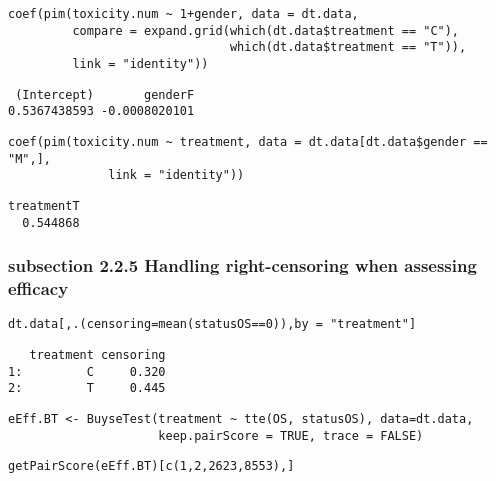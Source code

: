 \documentclass[12pt]{article}
\begin{document}
\lstset{language=r,label= ,caption= ,captionpos=b,numbers=none}
\begin{lstlisting}
coef(pim(toxicity.num ~ 1+gender, data = dt.data,
         compare = expand.grid(which(dt.data$treatment == "C"),
                               which(dt.data$treatment == "T")),
         link = "identity"))

\end{lstlisting}

\begin{verbatim}
 (Intercept)       genderF 
0.5367438593 -0.0008020101
\end{verbatim}


\lstset{language=r,label= ,caption= ,captionpos=b,numbers=none}
\begin{lstlisting}
coef(pim(toxicity.num ~ treatment, data = dt.data[dt.data$gender == "M",],
              link = "identity"))
\end{lstlisting}

\begin{verbatim}
treatmentT 
  0.544868
\end{verbatim}

\subsubsection{subsection 2.2.5 Handling right-censoring when assessing efficacy}
\label{sec:org316ac0f}

\lstset{language=r,label= ,caption= ,captionpos=b,numbers=none}
\begin{lstlisting}
dt.data[,.(censoring=mean(statusOS==0)),by = "treatment"]
\end{lstlisting}

\begin{verbatim}
   treatment censoring
1:         C     0.320
2:         T     0.445
\end{verbatim}


\lstset{language=r,label= ,caption= ,captionpos=b,numbers=none}
\begin{lstlisting}
eEff.BT <- BuyseTest(treatment ~ tte(OS, statusOS), data=dt.data,
                     keep.pairScore = TRUE, trace = FALSE)
\end{lstlisting}

\lstset{language=r,label= ,caption= ,captionpos=b,numbers=none}
\begin{lstlisting}
getPairScore(eEff.BT)[c(1,2,2623,8553),]
\end{lstlisting}
\end{document}
